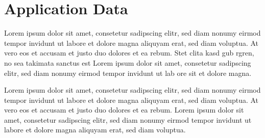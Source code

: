 \section{Application Data}

Lorem ipsum dolor sit amet, consetetur sadipscing elitr, sed diam nonumy eirmod tempor invidunt ut labore et dolore magna aliquyam erat, sed diam voluptua. At vero eos et accusam et justo duo dolores et ea rebum. Stet clita kasd gub rgren, no sea takimata sanctus est Lorem ipsum dolor sit amet, consetetur sadipscing elitr, sed diam nonumy eirmod tempor invidunt ut lab ore sit et dolore magna.

Lorem ipsum dolor sit amet, consetetur sadipscing elitr, sed diam nonumy eirmod tempor invidunt ut labore et dolore magna aliquyam erat, sed diam voluptua. At vero eos et accusam et justo duo dolores et ea rebum. Lorem ipsum dolor sit amet, consetetur sadipscing elitr, sed diam nonumy eirmod tempor invidunt ut labore et dolore magna aliquyam erat, sed diam voluptua.
